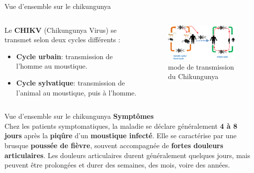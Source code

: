 \documentclass[aspectratio=169,xcolor=dvipsnames, t]{beamer}
\begin{document}
	\begin{frame}{Vue d'ensemble sur le chikungunya}
		\begin{columns}
			\begin{column}{0.45\textwidth}
				\justifying
			    Le \textbf{CHIKV} (Chikungunya Virus) se transmet selon deux cycles différents :
			    \begin{itemize}
			    	\item \textbf{Cycle urbain}: transmission de l'homme au moustique.
			    	\item \textbf{Cycle sylvatique}: transmission de l'animal au moustique, puis à l'homme.
			    \end{itemize}
			\end{column}
			\begin{column}{0.45\textwidth}  %
			    \begin{figure}
			    	\centering
			    	\includegraphics[width=1\textwidth]{figures/trans}
			    	\caption{mode de transmission du Chikungunya \cite{p4}}
			    \end{figure}
			\end{column}
		\end{columns}
	\end{frame}
	\begin{frame}{Vue d'ensemble sur le chikungunya}
		\justifying
		\textbf{\large{Symptômes}}\\[0.2cm]
		\qquad Chez les patients symptomatiques, la maladie se déclare généralement \textbf{4 à 8 jours} après la \textbf{piqûre} d'un\textbf{ moustique infecté}. Elle se caractérise par une brusque \textbf{poussée de fièvre}, souvent accompagnée de \textbf{fortes douleurs articulaires}. Les douleurs articulaires durent généralement quelques jours, mais peuvent être prolongées et durer des semaines, des mois, voire des années.\\[0.2cm]
	\end{frame}
\end{document}
